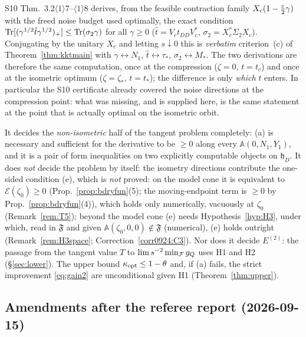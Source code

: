 \documentclass[11pt]{article}
\newcommand{\hh}{\mathfrak h}
\newcommand{\Aop}{\mathbb A}
\begin{document}
\begin{remark}\label{rem:consist}
S10 Thm.~3.2$\langle1\rangle7$--$\langle1\rangle8$ derives, from the feasible contraction
family $X_c(1-\frac{\varepsilon}2\gamma)$ with the freed noise budget used optimally, the exact
condition $\operatorname{Tr}[(\gamma^{1/2}\hat t\gamma^{1/2})_+]\le\operatorname{Tr}(\sigma_2\gamma)$ for all
$\gamma\ge0$ ($\hat t=V_ct_{DD}V_c^*$, $\sigma_2=X_c^*\Sigma_2X_c$).  Conjugating by the
unitary $X_c$ and letting $s\downarrow0$ this is \emph{verbatim} criterion~(c) of
Theorem~\ref{thm:kktmain} with $\gamma\leftrightarrow N_1$, $\hat t\leftrightarrow\tau_*$,
$\sigma_2\leftrightarrow M_*$.  The two derivations are therefore the same computation,
once at the compression ($\zeta=0$, $t=t_c$) and once at the isometric optimum
($\zeta=\zeta_*$, $t=t_*$); the difference is only \emph{which} $t$ enters.  In particular
the S10 certificate already covered the noise directions at the compression point: what was
missing, and is supplied here, is the same statement at the point that is actually optimal
on the isometric orbit.
\end{remark}

\begin{verdictgap}
It decides the \emph{non-isometric} half of the tangent problem completely: (a) is
necessary and sufficient for the derivative to be $\ge0$ along every
$\Aop(0,N_1,Y_1)$, and it is a pair of form inequalities on two explicitly computable
objects on $\hh_D$.  It does \emph{not} decide the problem by itself: the isometry
directions contribute the one-sided condition (e), which is \emph{not} proved: on the model cone it is
equivalent to $\mathcal E(\zeta_0)\ge0$ (Prop.~\ref{prop:bdryfun}(5); the moving-endpoint term is $\ge0$ by Prop.~\ref{prop:bdryfun}(4)), which holds only numerically, vacuously at $\zeta_0$ (Remark~\ref{rem:T5}); beyond the model cone (e) needs
Hypothesis~\ref{hyp:H3}, under which, read in $\mathfrak F$ and given $\Aop(\zeta_0,0,0)\notin\mathfrak F$ (numerical), (e) holds outright (Remark~\ref{rem:H3space}; Correction~\ref{corr0924:C3}).  Nor does it decide $E^{(2)}$: the passage from the tangent value
$T$ to $\lim s^{-2}\min_\mathcal F g_Q$ uses H1 and H2 (\S\ref{sec:lower}).  The upper bound
$\kappa_{\rm opt}\le1-\theta$ and, if (a) fails, the strict improvement
\eqref{eq:gain2} are unconditional given H1 (Theorem~\ref{thm:upper}).
\end{verdictgap}


\subsection{Amendments after the referee report (2026-09-15)}\label{sec:amend}
\end{document}
